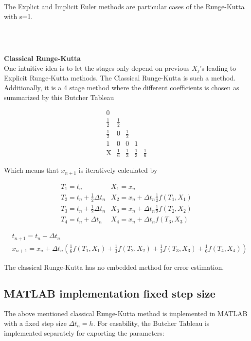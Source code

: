 The Explict and Implicit Euler methods are particular cases of the Runge-Kutta with s=1.

\\\

\textbf{Classical Runge-Kutta}\\
One intuitive idea is to let the stages only depend on previous $X_j$'s leading to Explicit Runge-Kutta methods. The Classical Runge-Kutta is such a method. Additionally, it is a 4 stage method where the different coefficients is chosen as summarized by this Butcher Tableau \cite{JrgensenRunge-KuttaEquations}

$$
\begin{array}{c|cccc}
0 & & & & \\
\frac{1}{2} & \frac{1}{2} & & & \\
\frac{1}{2} & 0 & \frac{1}{2} & & \\
1 & 0 & 0 & 1 & \\
\hline \mathrm{X} & \frac{1}{6} & \frac{1}{3} & \frac{1}{3} & \frac{1}{6}
\end{array}
$$

Which means that $x_{n+1}$ is iteratively calculated by

\begin{equation*}
\begin{array}{ll}
T_{1}=t_{n} & X_{1}=x_{n} \\
T_{2}=t_{n}+\frac{1}{2} \Delta t_n & X_{2}=x_{n}+\Delta t_n \frac{1}{2} f\left(T_{1}, X_{1}\right) \\
T_{3}=t_{n}+\frac{1}{2} \Delta t_n & X_{3}=x_{n}+\Delta t_n \frac{1}{2} f\left(T_{2}, X_{2}\right) \\
T_{4}=t_{n}+\Delta t_n & X_{4}=x_{n}+\Delta t_n f\left(T_{3}, X_{3}\right)
\end{array}
\end{equation*}

\begin{equation}
\begin{aligned}
&t_{n+1}=t_{n}+\Delta t_n \\
&x_{n+1}=x_{n}+\Delta t_n\left(\frac{1}{6} f\left(T_{1}, X_{1}\right)+\frac{1}{3} f\left(T_{2}, X_{2}\right)+\frac{1}{3} f\left(T_{3}, X_{3}\right)+\frac{1}{6} f\left(T_{4}, X_{4}\right)\right)
\end{aligned}
\end{equation}

The classical Runge-Kutta has no embedded method for error estimation.

\subsection{MATLAB implementation fixed step size}
The above mentioned classical Runge-Kutta method is implemented in MATLAB with a fixed step size $\Delta t_n = h$. For easability, the Butcher Tableau is implemented separately for exporting the parameters:

